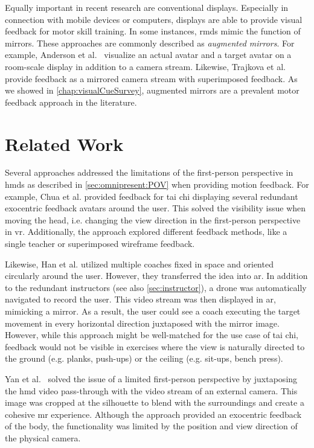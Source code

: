 Equally important in recent research are conventional displays. Especially in connection with mobile devices or computers, displays are able to provide visual feedback for motor skill training. In some instances, \acrshort{rmd}s mimic the function of mirrors. These approaches are commonly described as \emph{augmented mirrors}. For example, Anderson et al.~\cite{anderson2013youmove} visualize an actual avatar and a target avatar on a room-scale display in addition to a camera stream. Likewise, Trajkova et al.~\cite{trajkova2018ttb} provide feedback as a mirrored camera stream with superimposed feedback. As we showed in \autoref{chap:visualCueSurvey}, augmented mirrors are a prevalent motor feedback approach in the literature. 

\section{Related Work}
Several approaches addressed the limitations of the first-person perspective in \acrshort{hmd}s as described in \autoref{sec:omnipresent:POV} when providing motion feedback. For example, Chua et al. \cite{chua2003tpt} provided feedback for tai chi displaying several redundant exocentric feedback avatars around the user. This solved the visibility issue when moving the head, i.e. changing the view direction in the first-person perspective in \acrshort{vr}. Additionally, the approach explored different feedback methods, like a single teacher or superimposed wireframe feedback.

Likewise, Han et al. \cite{han2017mtc} utilized multiple coaches fixed in space and oriented circularly around the user. However, they transferred the idea into \acrshort{ar}. In addition to the redundant instructors (see also \autoref{sec:instructor}), a drone was automatically navigated to record the user. This video stream was then displayed in \acrshort{ar}, mimicking a mirror. As a result, the user could see a coach executing the target movement in every horizontal direction juxtaposed with the mirror image. However, while this approach might be well-matched for the use case of tai chi, feedback would not be visible in exercises where the view is naturally directed to the ground (e.g. planks, push-ups) or the ceiling (e.g. sit-ups, bench press).

Yan et al.~\cite{Yan2015oma} solved the issue of a limited first-person perspective by juxtaposing the \acrshort{hmd} video pass-through with the video stream of an external camera. This image was cropped at the silhouette to blend with the surroundings and create a cohesive \acrshort{mr} experience. Although the approach provided an exocentric feedback of the body, the functionality was limited by the position and view direction of the physical camera.

